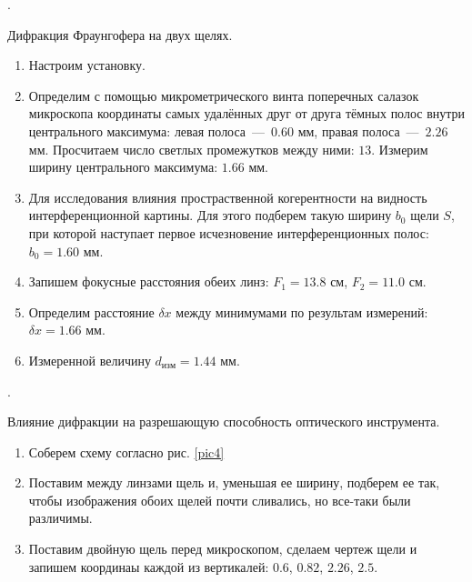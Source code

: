 \documentclass[a4paper, 12pt]{article}
\newcounter{Points}
\newcommand{\point}{\Asbuk{Points}. \addtocounter{Points}{1}}
\begin{document}
\point Дифракция Фраунгофера на двух щелях.

\begin{enumerate}
    \item Настроим установку.

    \item Определим с помощью микрометрического винта поперечных салазок микроскопа координаты самых удалённых друг от друга тёмных полос внутри центрального максимума: левая полоса~---~$0.60$ мм, правая полоса~---~$2.26$ мм. Просчитаем число светлых промежутков между ними: $13$. Измерим ширину центрального максимума: $1.66$ мм.

    \item Для исследования влияния простраственной когерентности на видность интерференционной картины. Для этого подберем такую ширину $b_0$ щели $S$, при которой наступает первое исчезновение интерференционных полос: $b_0 = 1.60$ мм.

    \item Запишем фокусные расстояния обеих линз: $F_1 = 13.8$ см, $F_2 = 11.0$ см.

    \item Определим расстояние $\delta x$ между минимумами по результам измерений: $\delta x = 1.66$ мм. 

    \item Измеренной величину $d_{изм} = 1.44$ мм.
\end{enumerate}

\point Влияние дифракции на разрешающую способность оптического инструмента.

\begin{enumerate}
    \item Соберем схему согласно рис. \ref{pic4}
    \item Поставим между линзами щель и, уменьшая ее ширину, подберем ее так, чтобы изображения обоих щелей почти сливались, но все-таки были различимы.
    \item Поставим двойную щель перед микроскопом, сделаем чертеж щели и запишем координаы каждой из вертикалей: $0.6$, $0.82$, $2.26$, $2.5$.
\end{enumerate}

\end{document}
